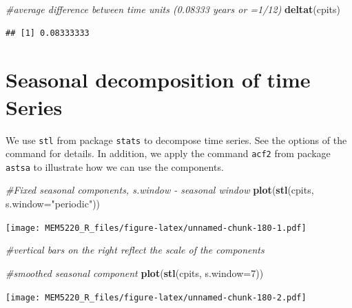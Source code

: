 \documentclass[]{book}
\newenvironment{Shaded}{\begin{snugshade}}{\end{snugshade}}
\newcommand{\CommentTok}[1]{\textcolor[rgb]{0.56,0.35,0.01}{\textit{#1}}}
\newcommand{\DataTypeTok}[1]{\textcolor[rgb]{0.13,0.29,0.53}{#1}}
\newcommand{\DecValTok}[1]{\textcolor[rgb]{0.00,0.00,0.81}{#1}}
\newcommand{\KeywordTok}[1]{\textcolor[rgb]{0.13,0.29,0.53}{\textbf{#1}}}
\newcommand{\NormalTok}[1]{#1}
\newcommand{\OperatorTok}[1]{\textcolor[rgb]{0.81,0.36,0.00}{\textbf{#1}}}
\newcommand{\StringTok}[1]{\textcolor[rgb]{0.31,0.60,0.02}{#1}}
\begin{document}
\begin{Shaded}
\begin{Highlighting}[]
\CommentTok{#average difference between time units (0.08333 years or =1/12)}
\KeywordTok{deltat}\NormalTok{(cpits)}
\end{Highlighting}
\end{Shaded}

\begin{verbatim}
## [1] 0.08333333
\end{verbatim}

\hypertarget{seasonal-decomposition-of-time-series}{%
\section{Seasonal decomposition of time Series}\label{seasonal-decomposition-of-time-series}}

We use \texttt{stl} from package \texttt{stats} to decompose time series. See the options of the command for details.
In addition, we apply the command \texttt{acf2} from package \texttt{astsa} to illustrate how we can use the components.

\begin{Shaded}
\begin{Highlighting}[]
\CommentTok{#Fixed seasonal components, s.window - seasonal window}
\KeywordTok{plot}\NormalTok{(}\KeywordTok{stl}\NormalTok{(cpits, }\DataTypeTok{s.window=}\StringTok{"periodic"}\NormalTok{))}
\end{Highlighting}
\end{Shaded}

\texttt{[image: MEM5220\_R\_files/figure-latex/unnamed-chunk-180-1.pdf]}

\begin{Shaded}
\begin{Highlighting}[]
\CommentTok{#vertical bars on the right reflect the scale of the components}

\CommentTok{#smoothed seasonal component}
\KeywordTok{plot}\NormalTok{(}\KeywordTok{stl}\NormalTok{(cpits, }\DataTypeTok{s.window=}\DecValTok{7}\NormalTok{))}
\end{Highlighting}
\end{Shaded}

\texttt{[image: MEM5220\_R\_files/figure-latex/unnamed-chunk-180-2.pdf]}

\begin{Shaded}
\end{Shaded}
\end{document}
